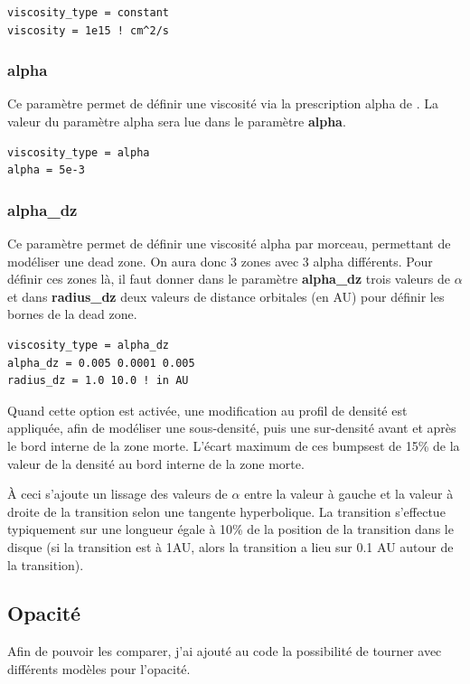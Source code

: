 \begin{verbatim}
viscosity_type = constant
viscosity = 1e15 ! cm^2/s
\end{verbatim}

\subsubsection{alpha}
Ce paramètre permet de définir une viscosité via la prescription alpha de \cite{shakura1973black}. La valeur du paramètre alpha sera lue dans le paramètre \textbf{alpha}. 

\begin{verbatim}
viscosity_type = alpha
alpha = 5e-3
\end{verbatim}

\subsubsection{alpha\_dz}
Ce paramètre permet de définir une viscosité alpha par morceau, permettant de modéliser une dead zone. On aura donc 3 zones avec 3 alpha différents. Pour définir ces zones là, il faut donner dans le paramètre \textbf{alpha\_dz} trois valeurs de $\alpha$ et dans \textbf{radius\_dz} deux valeurs de distance orbitales (en AU) pour définir les bornes de la dead zone.
\begin{verbatim}
viscosity_type = alpha_dz
alpha_dz = 0.005 0.0001 0.005
radius_dz = 1.0 10.0 ! in AU
\end{verbatim}

Quand cette option est activée, une modification au profil de densité est appliquée, afin de modéliser une sous-densité, puis une sur-densité avant et après le bord interne de la zone morte. L'écart maximum de ces \og bumps\fg est de 15\% de la valeur de la densité au bord interne de la zone morte. 

À ceci s'ajoute un lissage des valeurs de $\alpha$ entre la valeur à gauche et la valeur à droite de la transition selon une tangente hyperbolique. La transition s'effectue typiquement sur une longueur égale à 10\% de la position de la transition dans le disque (si la transition est à 1AU, alors la transition a lieu sur 0.1 AU autour de la transition).

\subsection{Opacité}
Afin de pouvoir les comparer, j'ai ajouté au code la possibilité de tourner avec différents modèles pour l'opacité. 

